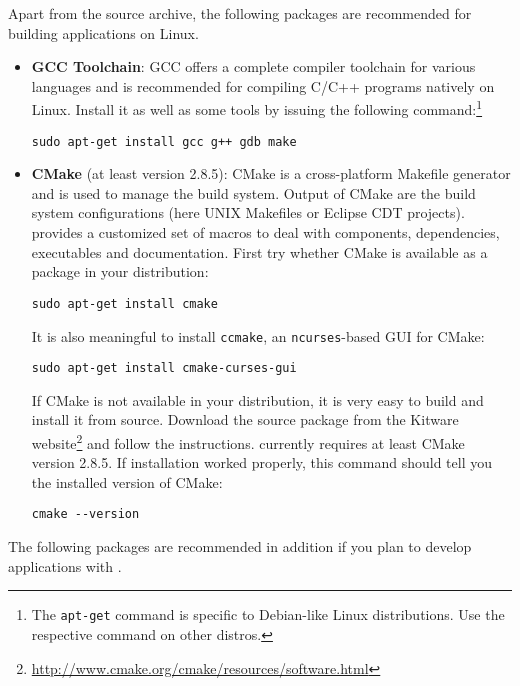 Apart from the \xme source archive, the following packages are recommended for building \xme applications on Linux.
\begin{itemize}
	\item \textbf{GCC Toolchain}:
		GCC offers a complete compiler toolchain for various languages
		and is recommended for compiling C/C++ programs natively on Linux.
		Install it as well as some tools by issuing the following command:\footnote{%
			The \texttt{apt-get} command is specific to Debian-like Linux distributions.
			Use the respective command on other distros.
		}
		
		\verb|sudo apt-get install gcc g++ gdb make|
	
	\item \textbf{CMake} (at least version 2.8.5):
		CMake is a cross-platform Makefile generator and is used to manage the build system.
		Output of CMake are the build system configurations (here UNIX Makefiles or Eclipse CDT projects).
		\xme provides a customized set of macros to deal with components, dependencies, executables and documentation.
		First try whether CMake is available as a package in your distribution:
		
		\verb|sudo apt-get install cmake|
		
		It is also meaningful to install \verb|ccmake|, an \verb|ncurses|-based GUI for CMake:
		
		\verb|sudo apt-get install cmake-curses-gui|
		
		If CMake is not available in your distribution, it is very easy to build and install it from source.
		Download the source package from the Kitware website\footnote{\url{http://www.cmake.org/cmake/resources/software.html}}
		and follow the instructions.
		\xme currently requires at least CMake version 2.8.5.
		If installation worked properly, this command should tell you the installed version of CMake:
		
		\verb|cmake --version|
\end{itemize}
%
The following packages are recommended in addition if you plan to develop applications with \xme.
